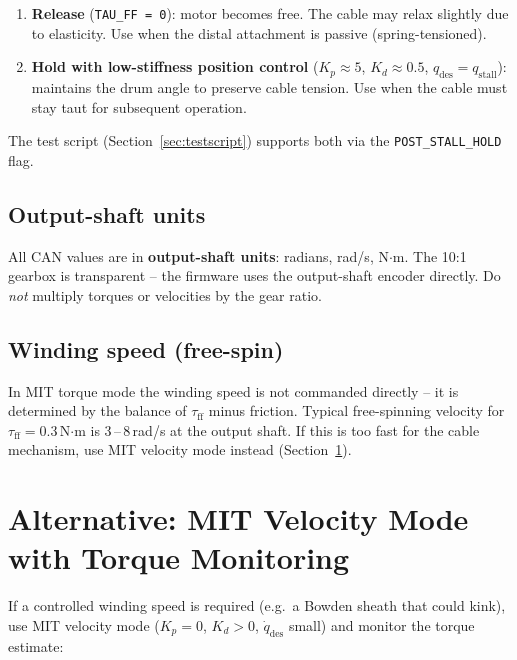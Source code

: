 \documentclass[11pt,a4paper]{article}
\begin{document}
\begin{enumerate}
  \item \textbf{Release} (\texttt{TAU\_FF = 0}): motor becomes free.
        The cable may relax slightly due to elasticity.  Use when the
        distal attachment is passive (spring-tensioned).
  \item \textbf{Hold with low-stiffness position control}
        ($K_p \approx 5$, $K_d \approx 0.5$, $q_\text{des} = q_\text{stall}$):
        maintains the drum angle to preserve cable tension.
        Use when the cable must stay taut for subsequent operation.
\end{enumerate}

The test script (Section~\ref{sec:testscript}) supports both via the
\texttt{POST\_STALL\_HOLD} flag.

\subsection{Output-shaft units}

All CAN values are in \textbf{output-shaft units}: radians, rad/s, N$\cdot$m.
The 10:1 gearbox is transparent -- the firmware uses the output-shaft encoder
directly.  Do \emph{not} multiply torques or velocities by the gear ratio.

\subsection{Winding speed (free-spin)}

In MIT torque mode the winding speed is not commanded directly -- it is
determined by the balance of $\tau_\text{ff}$ minus friction.  Typical
free-spinning velocity for $\tau_\text{ff} = 0.3$\,N$\cdot$m is
3\,--\,8\,rad/s at the output shaft.  If this is too fast for the cable
mechanism, use MIT velocity mode instead (Section~\ref{sec:velmode}).

\section{Alternative: MIT Velocity Mode with Torque Monitoring}
\label{sec:velmode}

If a controlled winding speed is required (e.g.\ a Bowden sheath that could
kink), use MIT velocity mode ($K_p = 0$, $K_d > 0$, $\dot q_\text{des}$
small) and monitor the torque estimate:
\end{document}
